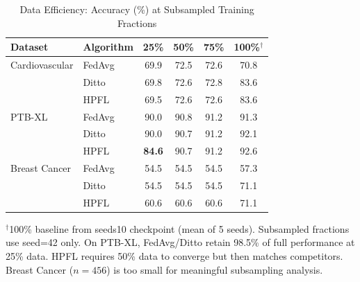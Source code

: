 \documentclass[conference]{IEEEtran}
\begin{document}
\begin{table}[htbp]
\centering
\caption{Data Efficiency: Accuracy (\%) at Subsampled Training Fractions}
\label{tab:data_efficiency}
\small
\begin{tabular}{llcccc}
\toprule
\textbf{Dataset} & \textbf{Algorithm} & \textbf{25\%} & \textbf{50\%} & \textbf{75\%} & \textbf{100\%}$^\dagger$ \\
\midrule
Cardiovascular & FedAvg & 69.9 & 72.5 & 72.6 & 70.8 \\
 & Ditto & 69.8 & 72.6 & 72.8 & 83.6 \\
 & HPFL & 69.5 & 72.6 & 72.6 & 83.6 \\
\midrule
PTB-XL & FedAvg & 90.0 & 90.8 & 91.2 & 91.3 \\
 & Ditto & 90.0 & 90.7 & 91.2 & 92.1 \\
 & HPFL & \textbf{84.6} & 90.7 & 91.2 & 92.6 \\
\midrule
Breast Cancer & FedAvg & 54.5 & 54.5 & 54.5 & 57.3 \\
 & Ditto & 54.5 & 54.5 & 54.5 & 71.1 \\
 & HPFL & 60.6 & 60.6 & 60.6 & 71.1 \\
\bottomrule
\end{tabular}

\vspace{1mm}
\footnotesize{$^\dagger$100\% baseline from seeds10 checkpoint (mean of 5 seeds). Subsampled fractions use seed=42 only. On PTB-XL, FedAvg/Ditto retain 98.5\% of full performance at 25\% data. HPFL requires 50\% data to converge but then matches competitors. Breast Cancer ($n{=}456$) is too small for meaningful subsampling analysis.}
\end{table}
\end{document}
